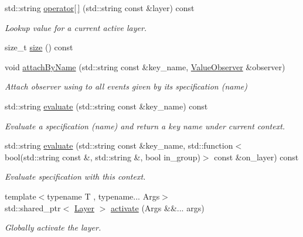 \begin{DoxyCompactItemize}
\item 
std\+::string \mbox{\hyperlink{classkdb_1_1Context_adbd89b28f978fb99bb5315cf7732c40f}{operator\mbox{[}$\,$\mbox{]}}} (std\+::string const \&layer) const
\begin{DoxyCompactList}\small\item\em Lookup value for a current active layer. \end{DoxyCompactList}\item 
size\+\_\+t \mbox{\hyperlink{classkdb_1_1Context_a2208d178203f74652a2a023b66d445fd}{size}} () const
\item 
void \mbox{\hyperlink{classkdb_1_1Context_afcbfe897ee36eb4fee23640051122e54}{attach\+By\+Name}} (std\+::string const \&key\+\_\+name, \mbox{\hyperlink{classkdb_1_1ValueObserver}{Value\+Observer}} \&observer)
\begin{DoxyCompactList}\small\item\em Attach observer using to all events given by its specification (name) \end{DoxyCompactList}\item 
std\+::string \mbox{\hyperlink{classkdb_1_1Context_a7cf9cda848595583ea35c8041d6466ee}{evaluate}} (std\+::string const \&key\+\_\+name) const
\begin{DoxyCompactList}\small\item\em Evaluate a specification (name) and return a key name under current context. \end{DoxyCompactList}\item 
std\+::string \mbox{\hyperlink{classkdb_1_1Context_a50ecf7ad3b5685f11a0bdaa65abd8f62}{evaluate}} (std\+::string const \&key\+\_\+name, std\+::function$<$ bool(std\+::string const \&, std\+::string \&, bool in\+\_\+group)$>$ const \&on\+\_\+layer) const
\begin{DoxyCompactList}\small\item\em Evaluate specification with this context. \end{DoxyCompactList}\item 
{\footnotesize template$<$typename T , typename... Args$>$ }\\std\+::shared\+\_\+ptr$<$ \mbox{\hyperlink{classkdb_1_1Layer}{Layer}} $>$ \mbox{\hyperlink{classkdb_1_1Context_ae6313bea68b242fa50817c604a67e704}{activate}} (Args \&\&... args)
\begin{DoxyCompactList}\small\item\em Globally activate the layer. \end{DoxyCompactList}\end{DoxyCompactItemize}



